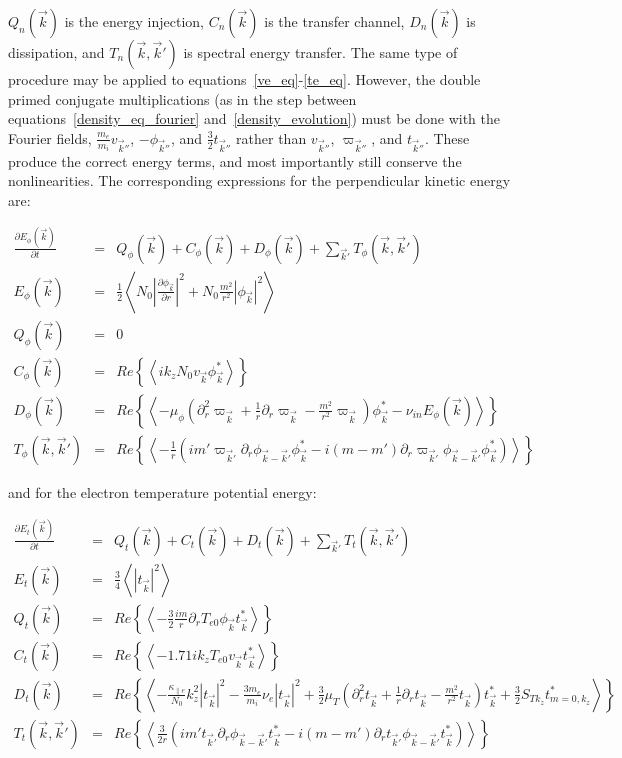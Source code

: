 \documentclass[showpacs,preprintnumbers,amsmath,amssymb,superscriptaddress]{revtex4}
\def\beqar{\begin{eqnarray}}
\def\eeqar{\end{eqnarray}}
\newcommand{\pdiff}[2]{\frac{\partial#1}{\partial#2}}
\newcommand{\pdr}{\partial_r}
\newcommand{\pdrr}{\partial^2_r}
\newcommand{\nue}{\nu_{e}}
\newcommand{\nuin}{\nu_{in}}
\newcommand{\kpe}{\kappa_{\parallel e}}
\newcommand{\fmei}{\frac{m_e}{m_i}}
\begin{document}
$Q_n(\vec{k})$ is the energy injection, $C_n(\vec{k})$ is the transfer channel, $D_n(\vec{k})$ is dissipation, and $T_n(\vec{k},\vec{k}')$ is spectral energy transfer.
The same type of procedure may be applied to equations~\ref{ve_eq}-\ref{te_eq}. 
However, the double primed conjugate multiplications (as in the step between equations~\ref{density_eq_fourier} and~\ref{density_evolution}) 
must be done with the Fourier fields, $\fmei v_{\vec{k}''}$,  $- \phi_{\vec{k}''}$, and $\frac{3}{2} t_{\vec{k}''}$ rather than 
$v_{\vec{k}''}$, $\varpi_{\vec{k}''}$, and $t_{\vec{k}''}$.
These produce the correct energy terms, and most importantly still conserve the nonlinearities. The corresponding expressions for the perpendicular kinetic energy are:

\beqar
\label{Fourier_phi_evolution}
\pdiff{E_\phi(\vec{k})}{t} & = & Q_\phi(\vec{k}) + C_\phi(\vec{k}) + D_\phi(\vec{k}) + \sum_{\vec{k}'} T_\phi(\vec{k},\vec{k}') \\
E_\phi(\vec{k}) & = & \frac{1}{2} \left<  N_0 \left| \pdiff{\phi_{\vec{k}}}{r} \right|^2 + N_0 \frac{m^2}{r^2} |\phi_{\vec{k}}|^2  \right>\\
Q_\phi(\vec{k}) & = & 0 \\
C_\phi(\vec{k}) & = & Re \left\{ \left< i k_z N_0 v_{\vec{k}} \phi_{\vec{k}}^* \right> \right\} \\
D_\phi(\vec{k}) & = & Re \left\{ \left<  - \mu_\phi( \pdrr \varpi_{\vec{k}} + \frac{1}{r} \pdr \varpi_{\vec{k}} - \frac{m^2}{r^2} \varpi_{\vec{k}}) \phi_{\vec{k}}^* -  \nuin E_\phi(\vec{k})\right> \right\} \\
T_\phi(\vec{k},\vec{k}') & = & Re \left\{ \left< - \frac{1}{r} \left( i m' \varpi_{\vec{k}'} \pdr \phi_{\vec{k}-\vec{k}'} \phi_{\vec{k}}^*  - i (m - m') \pdr \varpi_{\vec{k}'} \phi_{\vec{k}-\vec{k}'} \phi_{\vec{k}}^*        \right) \right> \right\}
\eeqar

and for the electron temperature potential energy:

\beqar
\label{Fourier_te_evolution}
\pdiff{E_t(\vec{k})}{t} & = & Q_t(\vec{k}) + C_t(\vec{k}) + D_t(\vec{k}) + \sum_{\vec{k}'} T_t(\vec{k},\vec{k}') \\
E_t(\vec{k}) & = & \frac{3}{4} \left< |t_{\vec{k}}|^2  \right> \\
Q_t(\vec{k}) & = & Re \left\{ \left< - \frac{3}{2} \frac{i m}{r} \pdr T_{e0} \phi_{\vec{k}} t_{\vec{k}}^* \right> \right\} \\
C_t(\vec{k}) & = & Re \left\{ \left<  - 1.71 i k_z T_{e0} v_{\vec{k}} t_{\vec{k}}^* \right> \right\} \\
D_t(\vec{k}) & = & Re \left\{ \left< -\frac{\kpe}{N_0} k_z^2 |t_{\vec{k}}|^2  - \frac{3 m_e}{m_i} \nue |t_{\vec{k}}|^2 
+ \frac{3}{2} \mu_T( \pdrr t_{\vec{k}} + \frac{1}{r} \pdr t_{\vec{k}} - \frac{m^2}{r^2} t_{\vec{k}}) t_{\vec{k}}^*  + \frac{3}{2} S_{T k_z} t_{m=0,k_z}^*  \right> \right\} \\
T_t(\vec{k},\vec{k}') & = & Re \left\{ \left< \frac{3}{2 r} \left( i m' t_{\vec{k}'} \pdr \phi_{\vec{k}-\vec{k}'} t_{\vec{k}}^*  - i (m - m') \pdr t_{\vec{k}'} \phi_{\vec{k}-\vec{k}'} t_{\vec{k}}^*        \right) \right> \right\}
\eeqar
\end{document}
